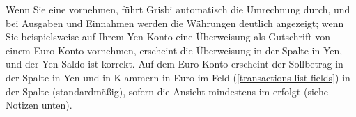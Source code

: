 Wenn Sie eine  vornehmen, führt Grisbi automatisch die Umrechnung durch, und bei Ausgaben und Einnahmen werden die Währungen deutlich angezeigt; wenn Sie beispielsweise auf Ihrem Yen-Konto eine Überweisung als Gutschrift von einem Euro-Konto vornehmen, erscheint die Überweisung in der Spalte  in Yen, und der Yen-Saldo ist korrekt. Auf dem Euro-Konto erscheint der Sollbetrag in der Spalte  in Yen und in Klammern in Euro im Feld  (\vref{transactions-list-fields}) in der Spalte  (standardmäßig), sofern die Ansicht mindestens im  erfolgt (siehe Notizen unten).

